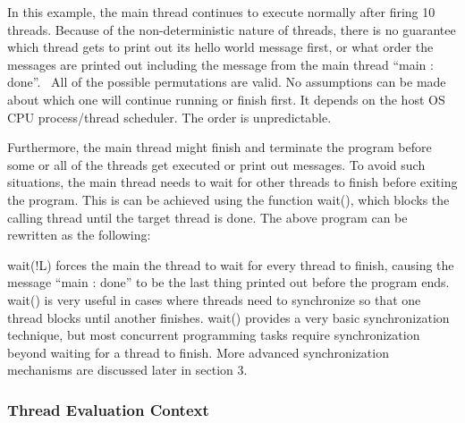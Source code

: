 In this example, the main thread continues to execute normally after
firing 10 threads. Because of the non-deterministic nature of threads,
there is no guarantee which thread gets to print out its hello world
message first, or what order the messages are printed out including the
message from the main thread
\textsf{{\textquotedblleft}}\textsf{main}\textsf{
}\textsf{:}\textsf{
}\textsf{done}\textsf{{\textquotedblright}}\textsf{.}
\ All of the possible permutations are valid. No assumptions can be
made about which one will continue running or finish first. It depends
on the host OS CPU process/thread scheduler. The order is
unpredictable.

Furthermore, the main thread might finish and terminate the program
before some or all of the threads get executed or print out messages.
To avoid such situations, the main thread needs to wait for other
threads to finish before exiting the program. This is can be achieved
using the function \textsf{wait()}, which blocks the calling
thread until the target thread is done. The above program can be
rewritten as the following:


\textsf{wait(!L)} forces the main the thread to wait for
every thread to finish, causing the message {\textquotedblleft}main :
done{\textquotedblright} to be the last thing printed out before the
program ends. \textsf{wait()} is very useful in cases
where threads need to synchronize so that one thread blocks until
another finishes. \textsf{wait()} provides a very basic
synchronization technique, but most concurrent programming tasks
require synchronization beyond waiting for a thread to finish. More
advanced synchronization mechanisms are discussed later in section 3.


\bigskip

\subsubsection[Thread Evaluation Context]{Thread Evaluation Context}

